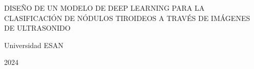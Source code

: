 \begin{center}
	{DISEÑO DE UN MODELO DE DEEP LEARNING PARA LA CLASIFICACIÓN DE NÓDULOS TIROIDEOS A TRAVÉS DE IMÁGENES DE ULTRASONIDO}
\end{center}

\vspace{3cm}

\rightline{\fillin[9cm]}
\vspace{3cm}

\rightline{\fillin[9cm]}
\vspace{3cm}

\rightline{\fillin[9cm]}
\vspace{3cm}

\centerline{Universidad ESAN}
\centerline{2024}